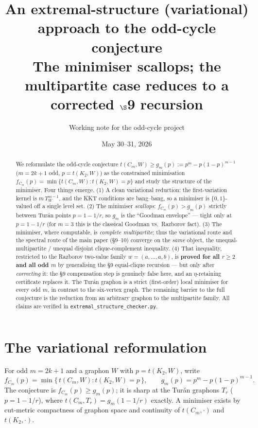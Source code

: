 \documentclass[11pt]{article}
\title{An extremal-structure (variational) approach to the odd-cycle conjecture\\
\large The minimiser scallops; the multipartite case reduces to a corrected $\S$9 recursion}
\author{Working note for the odd-cycle project}
\date{May 30--31, 2026}
\theoremstyle{remark}
\begin{document}
\maketitle

\begin{abstract}
We reformulate the odd-cycle conjecture $t(C_m,W)\ge g_m(p):=p^m-p(1-p)^{m-1}$ ($m=2k+1$ odd, $p=t(K_2,W)$) as the constrained minimisation $f_{C_m}(p)=\min\{t(C_m,W):t(K_2,W)=p\}$ and study the structure of the minimiser.  Four things emerge.  (1) A clean variational reduction: the first-variation kernel is $m\,T_W^{m-1}$, and the KKT conditions are bang--bang, so a minimiser is $\{0,1\}$-valued off a single level set.  (2) The minimiser \emph{scallops}: $f_{C_m}(p)>g_m(p)$ strictly between Tur\'an points $p=1-1/r$, so $g_m$ is the ``Goodman envelope'' --- tight only at $p=1-1/r$ (for $m=3$ this is the classical Goodman vs.\ Razborov fact).  (3) The minimiser, where computable, is \emph{complete multipartite}; thus the variational route and the spectral route of the main paper (\S9--10) converge on the \emph{same} object, the unequal-multipartite / unequal disjoint clique-complement inequality.  (4) That inequality, restricted to the Razborov two-value family $w=(a,\dots,a,b)$, is \textbf{proved for all $r\ge2$ and all odd $m$} by generalising the \S9 equal-clique recursion --- but only after \emph{correcting} it: the \S9 compensation step is genuinely false here, and an $\eta$-retaining certificate replaces it.  The Tur\'an graphon is a strict (first-order) local minimiser for every odd $m$, in contrast to the six-vertex graph.  The remaining barrier to the full conjecture is the reduction from an arbitrary graphon to the multipartite family.  All claims are verified in \texttt{extremal\_structure\_checker.py}.
\end{abstract}

\section{The variational reformulation}

For odd $m=2k+1$ and a graphon $W$ with $p=t(K_2,W)$, write
\[
        f_{C_m}(p)=\min\{\,t(C_m,W):t(K_2,W)=p\,\},
        \qquad g_m(p)=p^m-p(1-p)^{m-1}.
\]
The conjecture is $f_{C_m}(p)\ge g_m(p)$; it is sharp at the Tur\'an graphons $T_r$ ($p=1-1/r$), where $t(C_m,T_r)=g_m(1-1/r)$ exactly.  A minimiser exists by cut-metric compactness of graphon space and continuity of $t(C_m,\cdot)$ and $t(K_2,\cdot)$.
\end{document}
